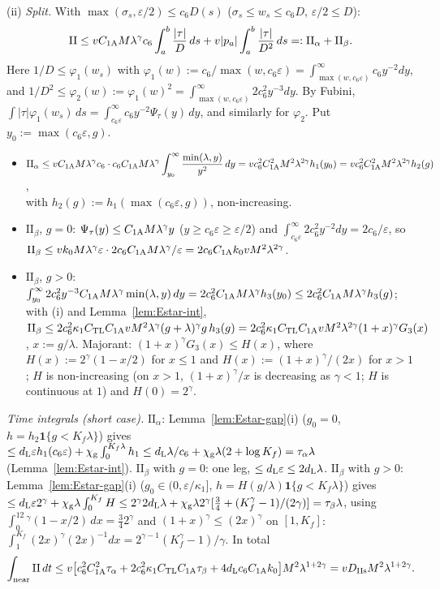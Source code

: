 (ii) \emph{Split.} With $\max(\sigma_s,\varepsilon/2)\le c_6D(s)$ ($\sigma_s\le w_s\le c_6D$, $\varepsilon/2\le D$):
\[
\mathrm{II}\le vC_{1\mathrm A} M\lambda^\gamma c_6\int_a^b\frac{|\tau|}D\,ds+v|p_a|\int_a^b\frac{|\tau|}{D^2}\,ds=:\mathrm{II}_\alpha+\mathrm{II}_\beta .
\]
Here $1/D\le\varphi_1(w_s)$ with $\varphi_1(w):=c_6/\max(w,c_6\varepsilon)=\int_{\max(w,c_6\varepsilon)}^\infty c_6y^{-2}dy$, and
$1/D^2\le\varphi_2(w):=\varphi_1(w)^2=\int_{\max(w,c_6\varepsilon)}^\infty2c_6^2y^{-3}dy$. By Fubini,
$\int|\tau|\varphi_1(w_s)\,ds=\int_{c_6\varepsilon}^\infty c_6y^{-2}\Psi_\tau(y)\,dy$, and similarly for $\varphi_2$. Put
$y_0:=\max(c_6\varepsilon,g)$.
\begin{itemize}
\item $\displaystyle\mathrm{II}_\alpha\le vC_{1\mathrm A} M\lambda^\gamma c_6\cdot c_6C_{1\mathrm A} M\lambda^\gamma\int_{y_0}^\infty\frac{\min(\lambda,y)}{y^2}\,dy
=vc_6^2C_{1\mathrm A}^2M^2\lambda^{2\gamma}h_1(y_0)=vc_6^2C_{1\mathrm A}^2M^2\lambda^{2\gamma}h_2(g)$,\\
with $h_2(g):=h_1(\max(c_6\varepsilon,g))$, non-increasing.
\item $\mathrm{II}_\beta$, $g=0$: $\Psi_\tau(y)\le C_{1\mathrm A} M\lambda^\gamma y$ ($y\ge c_6\varepsilon\ge\varepsilon/2$) and
$\int_{c_6\varepsilon}^\infty2c_6^2y^{-2}dy=2c_6/\varepsilon$, so
$\mathrm{II}_\beta\le vk_0M\lambda^\gamma\varepsilon\cdot2c_6C_{1\mathrm A} M\lambda^\gamma/\varepsilon=2c_6C_{1\mathrm A} k_0vM^2\lambda^{2\gamma}$.
\item $\mathrm{II}_\beta$, $g>0$: $\int_{y_0}^\infty2c_6^2y^{-3}C_{1\mathrm A} M\lambda^\gamma\min(\lambda,y)\,dy=2c_6^2C_{1\mathrm A} M\lambda^\gamma
h_3(y_0)\le2c_6^2C_{1\mathrm A} M\lambda^\gamma h_3(g)$; with (i) and Lemma~\ref{lem:Estar-int},
$\mathrm{II}_\beta\le2c_6^2\kappa_1C_{\mathrm{TL}}C_{1\mathrm A} vM^2\lambda^\gamma(g+\lambda)^\gamma g\,h_3(g)
=2c_6^2\kappa_1C_{\mathrm{TL}}C_{1\mathrm A} vM^2\lambda^{2\gamma}(1+x)^\gamma G_3(x)$, $x:=g/\lambda$. Majorant:
$(1+x)^\gamma G_3(x)\le H(x)$, where $H(x):=2^\gamma(1-x/2)$ for $x\le1$ and $H(x):=(1+x)^\gamma/(2x)$ for $x>1$; $H$ is
non-increasing (on $x>1$, $(1+x)^\gamma/x$ is decreasing as $\gamma<1$; $H$ is continuous at $1$) and $H(0)=2^\gamma$.
\end{itemize}
\emph{Time integrals (short case).} $\mathrm{II}_\alpha$: Lemma~\ref{lem:Estar-gap}(i) ($g_0=0$,
$h=h_2\mathbf 1\{g<K_f\lambda\}$) gives $\le d_{\mathrm L}\varepsilon h_1(c_6\varepsilon)+\chi_{\mathrm g}\int_0^{K_f\lambda}h_1\le d_{\mathrm L}\lambda/c_6+\chi_{\mathrm g}\lambda(2+\log K_f)
=\tau_\alpha\lambda$ (Lemma~\ref{lem:Estar-int}). $\mathrm{II}_\beta$ with $g=0$: one leg, $\le d_{\mathrm L}\varepsilon\le2d_{\mathrm L}\lambda$.
$\mathrm{II}_\beta$ with $g>0$: Lemma~\ref{lem:Estar-gap}(i) ($g_0\in(0,\varepsilon/\kappa_1]$, $h=H(g/\lambda)\mathbf 1\{g<K_f\lambda\}$)
gives $\le d_{\mathrm L}\varepsilon2^\gamma+\chi_{\mathrm g}\lambda\int_0^{K_f}H\le2^\gamma2d_{\mathrm L}\lambda+\chi_{\mathrm g}\lambda2^\gamma[\frac34+(K_f^\gamma-1)/(2\gamma)]
=\tau_\beta\lambda$, using $\int_0^12^\gamma(1-x/2)\,dx=\frac342^\gamma$ and $(1+x)^\gamma\le(2x)^\gamma$ on $[1,K_f]$:
$\int_1^{K_f}(2x)^\gamma(2x)^{-1}dx=2^{\gamma-1}(K_f^\gamma-1)/\gamma$. In total
\[
\int_{\mathrm{near}}\mathrm{II}\,dt\le v\bigl[c_6^2C_{1\mathrm A}^2\tau_\alpha+2c_6^2\kappa_1C_{\mathrm{TL}}C_{1\mathrm A}\tau_\beta+4d_{\mathrm L} c_6C_{1\mathrm A} k_0\bigr]
M^2\lambda^{1+2\gamma}=vD_{\mathrm{IIs}} M^2\lambda^{1+2\gamma}.
\]

